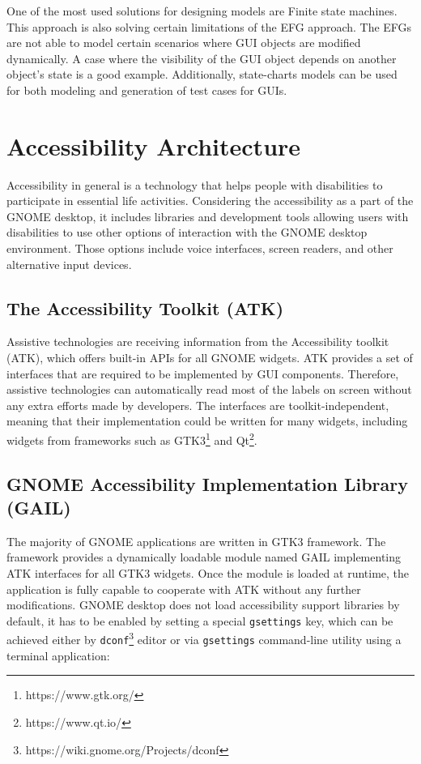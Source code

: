 One of the most used solutions for designing models are Finite state machines. This approach is also solving certain limitations of the EFG approach. The EFGs are not able to model certain scenarios where GUI objects are modified dynamically. A case where the visibility of the GUI object depends on another object's state is a good example. Additionally, state-charts models can be used for both modeling and generation of test cases for GUIs.\cite{patternbasedtesting}


\chapter{Accessibility Architecture}
Accessibility in general is a technology that helps people with disabilities to participate in essential life activities. Considering the accessibility as a part of the GNOME desktop, it includes libraries and development tools allowing users with disabilities to use other options of interaction with the GNOME desktop environment. Those options include voice interfaces, screen readers, and other alternative input devices.\cite{gnomeADG}
\section{The Accessibility Toolkit (ATK)}
Assistive technologies are receiving information from the Accessibility toolkit (ATK), which offers built-in APIs for all GNOME widgets. ATK provides a set of interfaces that are required to be implemented by GUI components. Therefore, assistive technologies can automatically read most of the labels on screen without any extra efforts made by developers. The interfaces are toolkit-independent, meaning that their implementation could be written for many widgets, including widgets from frameworks such as GTK3\footnote{https://www.gtk.org/} and Qt\footnote{https://www.qt.io/}.
\section{GNOME Accessibility Implementation Library (GAIL)}
The majority of GNOME applications are written in GTK3 framework. The framework provides a dynamically loadable module named GAIL implementing ATK interfaces for all GTK3 widgets. Once the module is loaded at runtime, the application is fully capable to cooperate with ATK without any further modifications.
GNOME desktop does not load accessibility support libraries by default, it has to be enabled by setting a special \texttt{gsettings} key, which can be achieved either by \texttt{dconf}\footnote{https://wiki.gnome.org/Projects/dconf} editor or via \texttt{gsettings} command-line utility using a terminal application:

